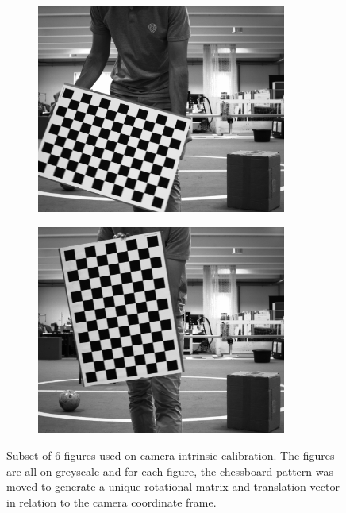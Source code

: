 \begin{figure}[!ht]
\begin{subfigure}[c]{0.30\textwidth}
		\includegraphics[width=0.9\textwidth]{img/camera-calibration/left-0044.png}
	\end{subfigure}
	\begin{subfigure}[c]{0.30\textwidth}
		\includegraphics[width=0.9\textwidth]{img/camera-calibration/left-0048.png}
	\end{subfigure}
	
	\caption{Subset of 6 figures used on camera intrinsic calibration. The figures are all on greyscale and for each figure, the chessboard pattern was moved to generate a unique rotational matrix and translation vector in relation to the camera coordinate frame.}
	\label{fig:camera-calibration-images}
\end{figure}

